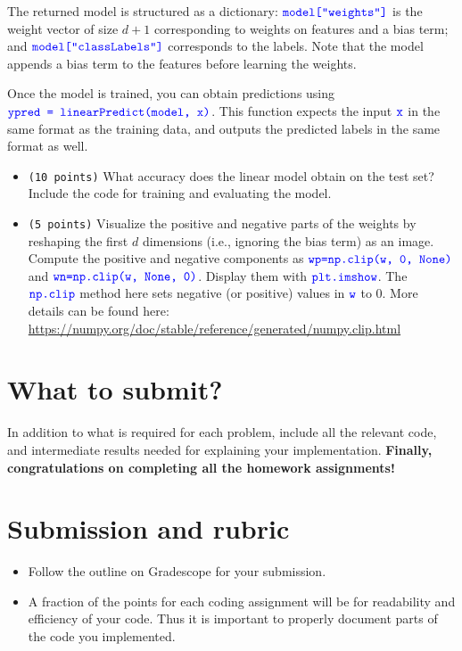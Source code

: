 \documentclass[10pt,letterpaper]{article}
\newcommand{\cmd}[1] {{\color{blue}\texttt{#1}}}
\begin{document}
  The returned model is structured as a dictionary:
$\cmd{model["weights"]}$ is the weight vector of size $d+1$
corresponding to weights on features and a bias term;
and $\cmd{model["classLabels"]}$ corresponds to the labels.
Note that the model appends a bias term to the features before learning the weights.

Once the model is trained, you can obtain predictions using
$\cmd{ypred = linearPredict(model, x)}$. This function expects the
input $\cmd{x}$ in the same format as the training data, 
and outputs the predicted labels in the same format as well.
\begin{itemize}
\item \cmd{(10 points)} What accuracy does the linear model obtain on
  the test set? Include the code for training and evaluating the
  model.
\item \cmd{(5 points)} Visualize the positive and negative parts of
  the weights by reshaping the first $d$ dimensions (i.e., ignoring
  the bias term) as an image. Compute the positive and negative
  components as $\cmd{wp=np.clip(w, 0, None)}$ and $\cmd{wn=np.clip(w,
    None, 0)}$. Display them with $\cmd{plt.imshow}$. 
The $\cmd{np.clip}$ method here sets negative (or positive) values in $\cmd{w}$ to 0.
More details can be found here: \url{https://numpy.org/doc/stable/reference/generated/numpy.clip.html}
\end{itemize}



\section{What to submit?}
In addition to what is required for each problem, include all the relevant code, and intermediate results needed for explaining your implementation. \textbf{Finally, congratulations on completing all the homework assignments!}

\section{Submission and rubric}

\begin{itemize}
\item Follow the outline on Gradescope for your submission. 
\item A fraction of the points for each coding assignment will be for
  readability and efficiency of your code. Thus it is important to
  properly document parts of the code you implemented.
\end{itemize}
\end{document}
